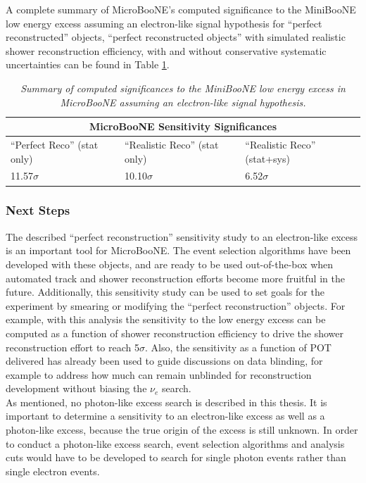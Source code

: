 A complete summary of MicroBooNE's computed significance to the MiniBooNE low energy excess assuming an electron-like signal hypothesis for ``perfect reconstructed'' objects, ``perfect reconstructed objects'' with simulated realistic shower reconstruction efficiency, with and without conservative systematic uncertainties can be found in Table \ref{LEE_final_significance_table}.

\begin{table}
\begin{tabular}{ |p{5 cm}|p{5 cm}|p{5 cm}|  }
 \hline
 \multicolumn{3}{|c|}{MicroBooNE Sensitivity Significances} \\
 \hline
 ``Perfect Reco'' (stat only) & ``Realistic Reco'' (stat only) & ``Realistic Reco'' (stat+sys) \\
 \hline \hline
 11.57$\sigma$ & 10.10$\sigma$ & 6.52$\sigma$\\\hline
 
 \hline
\end{tabular}
\caption{\textit{Summary of computed significances to the MiniBooNE low energy excess in MicroBooNE assuming an electron-like signal hypothesis.}}\label{LEE_final_significance_table}
\end{table}



\subsubsection{Next Steps}
The described ``perfect reconstruction'' sensitivity study to an electron-like excess is an important tool for MicroBooNE. The event selection algorithms have been developed with these objects, and are ready to be used out-of-the-box when automated track and shower reconstruction efforts become more fruitful in the future. Additionally, this sensitivity study can be used to set goals for the experiment by smearing or modifying the ``perfect reconstruction'' objects. For example, with this analysis the sensitivity to the low energy excess can be computed as a function of shower reconstruction efficiency to drive the shower reconstruction effort to reach 5$\sigma$. Also, the sensitivity as a function of POT delivered has already been used to guide discussions on data blinding, for example to address how much can remain unblinded for reconstruction development without biasing the $\nu_e$ search.\\

As mentioned, no photon-like excess search is described in this thesis. It is important to determine a sensitivity to an electron-like excess as well as a photon-like excess, because the true origin of the excess is still unknown. In order to conduct a photon-like excess search, event selection algorithms and analysis cuts would have to be developed to search for single photon events rather than single electron events.\\

